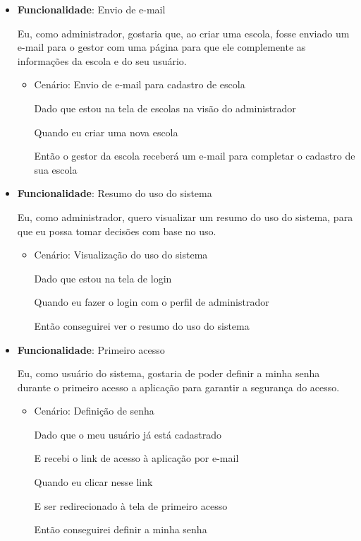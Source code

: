 \begin{itemize}
\item\textbf{Funcionalidade}: Envio de e-mail
    
    Eu, como administrador, gostaria que, ao criar uma escola, fosse enviado um e-mail para o gestor com uma página para que ele complemente as informações da escola e do seu usuário.
    \begin{itemize}
        \item Cenário: Envio de e-mail para cadastro de escola 
        \par Dado que estou na tela de escolas na visão do administrador
        \par Quando eu criar uma nova escola
        \par Então o gestor da escola receberá um e-mail para completar o cadastro de sua escola
    \end{itemize}    

\item\textbf{Funcionalidade}: Resumo do uso do sistema
    
    Eu, como administrador, quero visualizar um resumo do uso do sistema, para que eu possa tomar decisões com base no uso.
    \begin{itemize}
        \item Cenário: Visualização do uso do sistema 
        \par Dado que estou na tela de login
        \par Quando eu fazer o login com o perfil de administrador
        \par Então conseguirei ver o resumo do uso do sistema
    \end{itemize} 

\item\textbf{Funcionalidade}: Primeiro acesso
    
    Eu, como usuário do sistema, gostaria de poder definir a minha senha durante o primeiro acesso a aplicação para garantir a segurança do acesso.
    \begin{itemize}
        \item Cenário: Definição de senha  
        \par Dado que o meu usuário já está cadastrado
        \par E recebi o link de acesso à aplicação por e-mail
        \par Quando eu clicar nesse link
        \par E ser redirecionado à tela de primeiro acesso
        \par Então conseguirei definir a minha senha
    \end{itemize}


\end{itemize}
